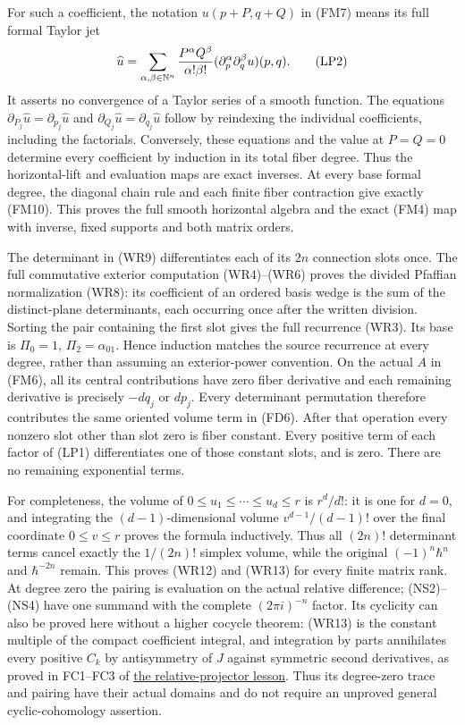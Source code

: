 \documentclass[
  11pt,
]{article}
\begin{document}
For such a coefficient, the notation \(u(p+P,q+Q)\) in (FM7) means its
full formal Taylor jet \[
 \widehat u=
 \sum_{\alpha,\beta\in\mathbb N^n}
       {P^\alpha Q^\beta\over\alpha!\beta!}
             (\partial_p^\alpha\partial_q^\beta u)(p,q).
 \tag{LP2}
\] It asserts no convergence of a Taylor series of a smooth function.
The equations \(\partial_{P_j}\widehat u=\partial_{p_j}\widehat u\) and
\(\partial_{Q_j}\widehat u=\partial_{q_j}\widehat u\) follow by
reindexing the individual coefficients, including the factorials.
Conversely, these equations and the value at \(P=Q=0\) determine every
coefficient by induction in its total fiber degree. Thus the
horizontal-lift and evaluation maps are exact inverses. At every base
formal degree, the diagonal chain rule and each finite fiber contraction
give exactly (FM10). This proves the full smooth horizontal algebra and
the exact (FM4) map with inverse, fixed supports and both matrix orders.

The determinant in (WR9) differentiates each of its \(2n\) connection
slots once. The full commutative exterior computation (WR4)--(WR6)
proves the divided Pfaffian normalization (WR8): its coefficient of an
ordered basis wedge is the sum of the distinct-plane determinants, each
occurring once after the written division. Sorting the pair containing
the first slot gives the full recurrence (WR3). Its base is \(\Pi_0=1\),
\(\Pi_2=\alpha_{01}\). Hence induction matches the source recurrence at
every degree, rather than assuming an exterior-power convention. On the
actual \(A\) in (FM6), all its central contributions have zero fiber
derivative and each remaining derivative is precisely \(-dq_j\) or
\(dp_j\). Every determinant permutation therefore contributes the same
oriented volume term in (FD6). After that operation every nonzero slot
other than slot zero is fiber constant. Every positive term of each
factor of (LP1) differentiates one of those constant slots, and is zero.
There are no remaining exponential terms.

For completeness, the volume of \(0\le u_1\le\cdots\le u_d\le r\) is
\(r^d/d!\): it is one for \(d=0\), and integrating the
\((d-1)\)-dimensional volume \(v^{d-1}/(d-1)!\) over the final
coordinate \(0\le v\le r\) proves the formula inductively. Thus all
\((2n)!\) determinant terms cancel exactly the \(1/(2n)!\) simplex
volume, while the original \((-1)^n\hbar^n\) and \(\hbar^{-2n}\) remain.
This proves (WR12) and (WR13) for every finite matrix rank. At degree
zero the pairing is evaluation on the actual relative difference;
(NS2)--(NS4) have one summand with the complete \((2\pi i)^{-n}\)
factor. Its cyclicity can also be proved here without a higher cocycle
theorem: (WR13) is the constant multiple of the compact coefficient
integral, and integration by parts annihilates every positive \(C_k\) by
antisymmetry of \(J\) against symmetric second derivatives, as proved in
FC1--FC3 of \href{relative-projectors-chern-cutoff.pdf}{the
relative-projector lesson}. Thus its degree-zero trace and pairing have
their actual domains and do not require an unproved general
cyclic-cohomology assertion.
\end{document}
